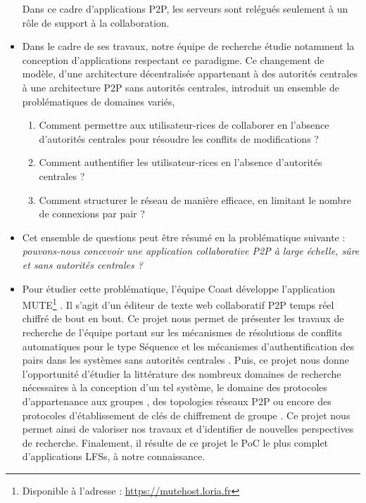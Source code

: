 \begin{itemize}
        Dans ce cadre d'applications \ac{P2P}, les serveurs sont relégués seulement à un rôle de support à la collaboration.
    \item Dans le cadre de ses travaux, notre équipe de recherche étudie notamment la conception d'applications respectant ce paradigme.
        Ce changement de modèle, d'une architecture décentralisée appartenant à des autorités centrales à une architecture \ac{P2P} sans autorités centrales, introduit un ensemble de problématiques de domaines variés, \eg
        \begin{enumerate}
            \item Comment permettre aux utilisateur-rices de collaborer en l'absence d'autorités centrales pour résoudre les conflits de modifications ?
            \item Comment authentifier les utilisateur-rices en l'absence d'autorités centrales ?
            \item Comment structurer le réseau de manière efficace, \ie en limitant le nombre de connexions par pair ?
        \end{enumerate}
    \item Cet ensemble de questions peut être résumé en la problématique suivante : \emph{pouvons-nous concevoir une application collaborative \ac{P2P} à large échelle, sûre et sans autorités centrales ?}
    \item Pour étudier cette problématique, l'équipe Coast développe l'application \acf{MUTE}\footnote{Disponible à l'adresse : \url{https://mutehost.loria.fr}} \cite{MUTE2017}.
        Il s'agit d'un éditeur de texte web collaboratif \ac{P2P} temps réel chiffré de bout en bout.
        Ce projet nous permet de présenter les travaux de recherche de l'équipe portant sur les mécanismes de résolutions de conflits automatiques pour le type Séquence \cite{2013-logootsplit,2021-these-vic,2022-rls-tpds-nicolas} et les mécanismes d'authentification des pairs dans les systèmes sans autorités centrales \cite{2018-trusternity-short,2018-trusternity-long}.
        Puis, ce projet nous donne l'opportunité d'étudier la littérature des nombreux domaines de recherche nécessaires à la conception d'un tel système, \ie le domaine des protocoles d'appartenance aux groupes \cite{swim2002, lifeguard2018}, des topologies réseaux \ac{P2P} \cite{2018-spray-nedelec} ou encore des protocoles d'établissement de clés de chiffrement de groupe \cite{1995-burmester-desmedt}.
        Ce projet nous permet ainsi de valoriser nos travaux et d'identifier de nouvelles perspectives de recherche.
        Finalement, il résulte de ce projet le \acf{PoC} le plus complet d'applications \acp{LFS}, à notre connaissance.
\end{itemize}
